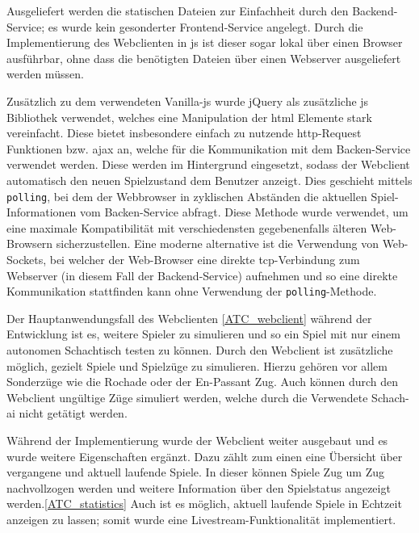 Ausgeliefert werden die statischen Dateien zur Einfachheit durch den
Backend-Service; es wurde kein gesonderter Frontend-Service angelegt.
Durch die Implementierung des Webclienten in \gls{js} ist dieser sogar
lokal über einen Browser ausführbar, ohne dass die benötigten Dateien
über einen Webserver ausgeliefert werden müssen.

Zusätzlich zu dem verwendeten Vanilla-\gls{js} wurde jQuery als
zusätzliche \gls{js} Bibliothek verwendet, welches eine Manipulation der
\gls{html} Elemente stark vereinfacht. Diese bietet insbesondere einfach
zu nutzende \gls{http}-Request Funktionen bzw. \gls{ajax} an, welche für
die Kommunikation mit dem Backen-Service verwendet werden. Diese werden
im Hintergrund eingesetzt, sodass der Webclient automatisch den neuen
Spielzustand dem Benutzer anzeigt. Dies geschieht mittels
\passthrough{\lstinline!polling!}, bei dem der Webbrowser in zyklischen
Abständen die aktuellen Spiel-Informationen vom Backen-Service abfragt.
Diese Methode wurde verwendet, um eine maximale Kompatibilität mit
verschiedensten gegebenenfalls älteren Web-Browsern sicherzustellen.
Eine moderne alternative ist die Verwendung von Web-Sockets, bei welcher
der Web-Browser eine direkte \gls{tcp}-Verbindung zum Webserver (in
diesem Fall der Backend-Service) aufnehmen und so eine direkte
Kommunikation stattfinden kann ohne Verwendung der
\passthrough{\lstinline!polling!}-Methode.

Der Hauptanwendungsfall des Webclienten \ref{ATC_webclient} während der
Entwicklung ist es, weitere Spieler zu simulieren und so ein Spiel mit
nur einem autonomen Schachtisch testen zu können. Durch den Webclient
ist zusätzliche möglich, gezielt Spiele und Spielzüge zu simulieren.
Hierzu gehören vor allem Sonderzüge wie die Rochade oder der En-Passant
Zug. Auch können durch den Webclient ungültige Züge simuliert werden,
welche durch die Verwendete Schach-\gls{ai} nicht getätigt werden.

Während der Implementierung wurde der Webclient weiter ausgebaut und es
wurde weitere Eigenschaften ergänzt. Dazu zählt zum einen eine Übersicht
über vergangene und aktuell laufende Spiele. In dieser können Spiele Zug
um Zug nachvollzogen werden und weitere Information über den Spielstatus
angezeigt werden.\ref{ATC_statistics} Auch ist es möglich, aktuell
laufende Spiele in Echtzeit anzeigen zu lassen; somit wurde eine
Livestream-Funktionalität implementiert.

